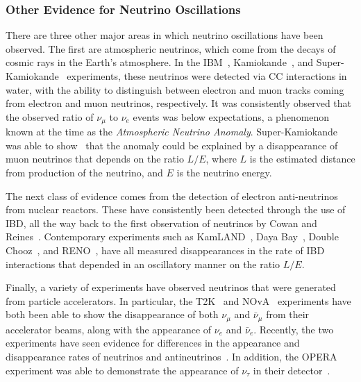 \subsubsection{Other Evidence for Neutrino Oscillations}
There are three other major areas in which neutrino oscillations have been observed. The first are atmospheric neutrinos, which come from the decays of cosmic rays in the Earth's atmosphere. In the  IBM~\cite{becker-szendyElectronMuonneutrinoContent1992}, %
Kamiokande~\cite{fukudaAtmosphericVmveRatio1994}, %
and Super-Kamiokande~\cite{fukudaEvidenceOscillationAtmospheric1998} %
experiments, these neutrinos were detected via CC interactions in water, with the ability to distinguish between electron and muon tracks coming from electron and muon neutrinos, respectively. It was consistently observed that the observed ratio of $\nu_{\mu}$ to $\nu_{e}$ events was below expectations, a phenomenon known at the time as the \textit{Atmospheric Neutrino Anomaly}. Super-Kamiokande was able to show~\cite{ashieEvidenceOscillatorySignature2004} that the anomaly could be explained by a disappearance of muon neutrinos that depends on the ratio $L/E$, where $L$ is the estimated distance from production of the neutrino, and $E$ is the neutrino energy.

The next class of evidence comes from the detection of electron anti-neutrinos from nuclear reactors. These have consistently been detected through the use of IBD, all the way back to the first observation of neutrinos by Cowan and Reines~\cite{cowanDetectionFreeNeutrino1956,reinesNeutrino1956}. Contemporary experiments such as KamLAND~\cite{gandoReactorOnoffAntineutrino2013}, Daya Bay~\cite{adeyMeasurementElectronAntineutrino2018}, Double Chooz~\cite{dekerretDoubleChoozTh132020}, and RENO~\cite{bakMeasurementReactorAntineutrino2018}, have all measured disappearances in the rate of IBD interactions that depended in an oscillatory manner on the ratio $L/E$.

Finally, a variety of experiments have observed neutrinos that were generated from particle accelerators. In particular, the T2K~\cite{abeImprovedConstraintsNeutrino2021,abeObservationElectronNeutrino2014} and NOvA~\cite{adamsonConstraintsOscillationParameters2017,adamsonFirstMeasurementElectron2016} experiments have both been able to show the disappearance of both $\nu_{\mu}$ and $\bar{\nu}_{\mu}$ from their accelerator beams, along with the appearance of $\nu_{e}$ and $\bar{\nu}_{e}$. Recently, the two experiments have seen evidence for differences in the appearance and disappearance rates of neutrinos and antineutrinos~\cite{abeConstraintMatterAntimatter2020,aceroFirstMeasurementNeutrino2019}. In addition, the OPERA experiment was able to demonstrate the appearance of $\nu_{\tau}$ in their detector~\cite{agafonovaFinalResultsOPERA2018}.

